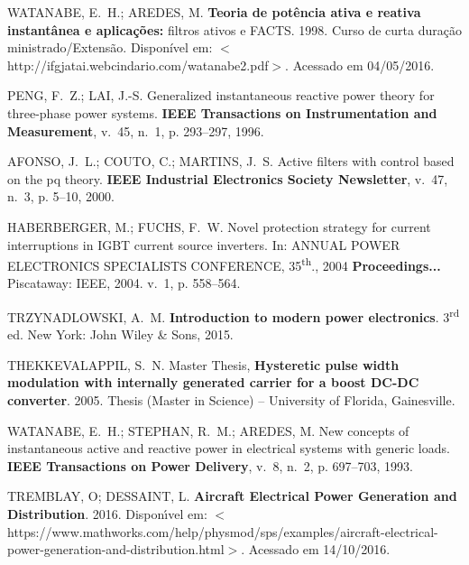 \begin{thebibliography}{}
{WATANABE, E.~H.; AREDES, M. \textbf{Teoria de pot\^encia ativa e reativa
  instant\^anea e aplica{\c{c}}{\~o}es:} filtros ativos e FACTS. 1998. 
  Curso de curta dura{\c{c}}{\~a}o ministrado/Extens{\~a}o. Dispon\'ivel em:
  $<$http://ifgjatai.webcindario.com/watanabe2.pdf$>$. 
  Acessado em 04/05/2016.}

{PENG, F.~Z.; LAI, J.-S. Generalized instantaneous reactive power theory for
  three-phase power systems.
\textbf{IEEE Transactions on Instrumentation and Measurement}, v.~45, n.~1,
  p. 293--297, 1996.}

{AFONSO, J.~L.; COUTO, C.; MARTINS, J.~S. Active filters with control based on
  the pq theory.
\textbf{IEEE Industrial Electronics Society Newsletter}, v.~47, n.~3, p.
  5--10, 2000.}

{HABERBERGER, M.; FUCHS, F.~W. Novel protection strategy for current
  interruptions in IGBT current source inverters. In: \uppercase{Annual 
  Power Electronics Specialists Conference,} 35\textsuperscript{th}., 2004 
  \textbf{Proceedings...} Piscataway: IEEE, 2004. v.~1, p. 558--564.}

{TRZYNADLOWSKI, A.~M. \textbf{Introduction to modern power electronics}.
	3\textsuperscript{rd} ed. New York: John Wiley \& Sons, 2015.}

{THEKKEVALAPPIL, S.~N.
Master Thesis, \textbf{Hysteretic pulse width modulation with internally
  generated carrier for a boost DC-DC converter}. 2005. Thesis (Master in Science) --
  University of Florida, Gainesville.}

{WATANABE, E.~H.; STEPHAN, R.~M.; AREDES, M. New concepts of instantaneous
  active and reactive power in electrical systems with generic loads.
\textbf{IEEE Transactions on Power Delivery}, v.~8, n.~2, p. 697--703,
  1993.}

{TREMBLAY, O; DESSAINT, L. \textbf{Aircraft Electrical Power Generation and
  Distribution}. 2016.
  Dispon{\'\i}vel em:
$<$https://www.mathworks.com/help/physmod/sps/examples/aircraft-electrical- power-generation-and-distribution.html$>$.}
  Acessado em 14/10/2016.



\end{thebibliography}
